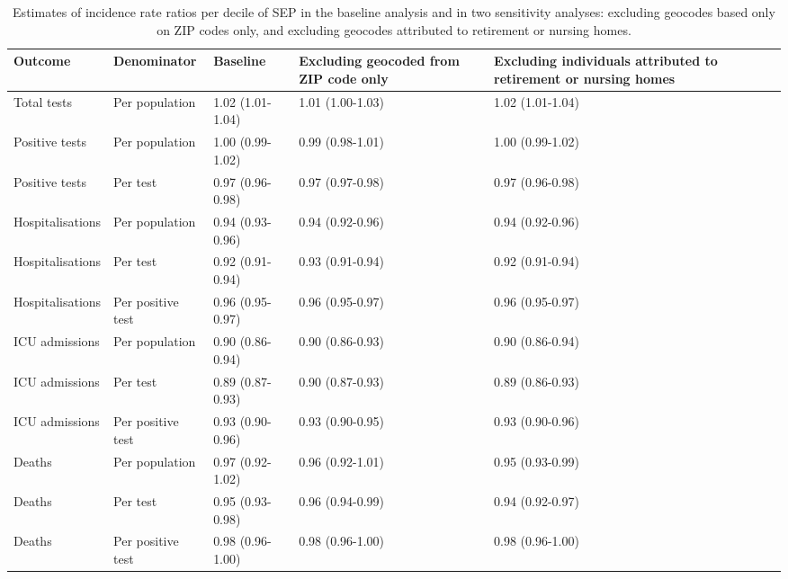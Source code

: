 \documentclass{article}
\begin{document}
	
	\begin{table}[ht]
		\caption{Estimates of incidence rate ratios per decile of SEP in the baseline analysis and in two sensitivity analyses: excluding geocodes based only on ZIP codes only, and excluding geocodes attributed to retirement or nursing homes.}
		\label{tab:sst}
		\centering
		\begin{tabular}{llp{3cm}p{3cm}p{3cm}}
			\hline
			Outcome & Denominator & Baseline & Excluding geocoded from ZIP code only & Excluding individuals attributed to retirement or nursing homes \\ 
			\hline
			Total tests & Per population & 1.02 (1.01-1.04) & 1.01 (1.00-1.03) & 1.02 (1.01-1.04) \\ 
			Positive tests & Per population & 1.00 (0.99-1.02) & 0.99 (0.98-1.01) & 1.00 (0.99-1.02) \\ 
			Positive tests & Per test & 0.97 (0.96-0.98) & 0.97 (0.97-0.98) & 0.97 (0.96-0.98) \\ 
			Hospitalisations & Per population & 0.94 (0.93-0.96) & 0.94 (0.92-0.96) & 0.94 (0.92-0.96) \\ 
			Hospitalisations & Per test & 0.92 (0.91-0.94) & 0.93 (0.91-0.94) & 0.92 (0.91-0.94) \\ 
			Hospitalisations & Per positive test & 0.96 (0.95-0.97) & 0.96 (0.95-0.97) & 0.96 (0.95-0.97) \\ 
			ICU admissions & Per population & 0.90 (0.86-0.94) & 0.90 (0.86-0.93) & 0.90 (0.86-0.94) \\ 
			ICU admissions & Per test & 0.89 (0.87-0.93) & 0.90 (0.87-0.93) & 0.89 (0.86-0.93) \\ 
			ICU admissions & Per positive test & 0.93 (0.90-0.96) & 0.93 (0.90-0.95) & 0.93 (0.90-0.96) \\ 
			Deaths & Per population & 0.97 (0.92-1.02) & 0.96 (0.92-1.01) & 0.95 (0.93-0.99) \\ 
			Deaths & Per test & 0.95 (0.93-0.98) & 0.96 (0.94-0.99) & 0.94 (0.92-0.97) \\ 
			Deaths & Per positive test & 0.98 (0.96-1.00) & 0.98 (0.96-1.00) & 0.98 (0.96-1.00) \\ 
			\hline
		\end{tabular}
	\end{table}
	
\end{document}
